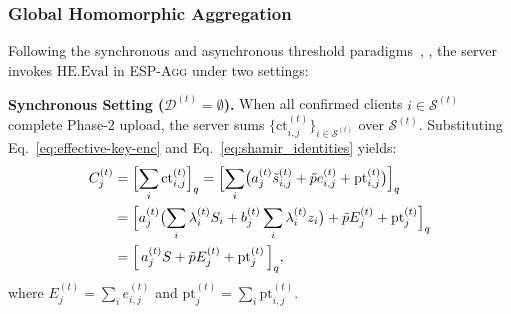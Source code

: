\subsubsection{Global Homomorphic Aggregation}
Following the synchronous and asynchronous threshold paradigms~\cite{colin2026tfhesd}, \cite{kim2026tfhead}, the server invokes $\mathrm{HE.Eval}$ in \textsc{ESP-Agg} under two settings:

\textbf{Synchronous Setting ($\mathcal{D}^{(t)} = \emptyset$).} When all confirmed clients $i \in \mathcal{S}^{(t)}$ complete Phase-2 upload, the server sums $\{\mathrm{ct}_{i,j}^{(t)}\}_{i \in \mathcal{S}^{(t)}}$ over $\mathcal{S}^{(t)}$. Substituting Eq.~\eqref{eq:effective-key-enc} and Eq.~\eqref{eq:shamir_identities} yields:
\begin{align}
C_j^{(t)} &= \Bigl[\sum_{i} \mathrm{ct}_{i,j}^{(t)}\Bigr]_q
= \Bigl[ \sum_{i} \bigl( a_j^{(t)} \tilde{s}_{i,j}^{(t)} + \tilde{p} e_{i,j}^{(t)} + \mathrm{pt}_{i,j}^{(t)} \bigr) \Bigr]_q \notag \\
&= \Bigl[ a_j^{(t)} \bigl( \sum_{i} \lambda_i^{(t)} S_i + b_j^{(t)} \sum_{i} \lambda_i^{(t)} z_i \bigr) + \tilde{p} E_j^{(t)} + \mathrm{pt}_j^{(t)} \Bigr]_q \notag \\
&= \Bigl[\, a_j^{(t)} S + \tilde{p} E_j^{(t)} + \mathrm{pt}_j^{(t)} \,\Bigr]_{q},
\label{eq:spatial-agg}
\end{align}
where $E_j^{(t)} = \sum_{i} e_{i,j}^{(t)}$ and $\mathrm{pt}_j^{(t)} = \sum_{i} \mathrm{pt}_{i,j}^{(t)}$.

